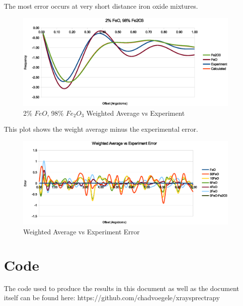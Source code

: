 \documentclass[12pt,letterpaper]{article}
\begin{document}
The most error occurs at very short distance iron oxide mixtures.
\begin{figure}[ht]
  \begin{center}
    \includegraphics[scale=0.8]{figs/2pct_FeO_WeightedAverage.eps}
    \caption{2\% $FeO$, 98\% $Fe_2O_3$ Weighted Average vs Experiment}
  \end{center}
\end{figure}
\clearpage

This plot shows the weight average minus the experimental error.
\begin{figure}[ht]
  \begin{center}
    \includegraphics[scale=0.8]{figs/WeightedAverageVsExperimentError.eps}
    \caption{Weighted Average vs Experiment Error}
  \end{center}
\end{figure}
\clearpage

\section{Code}
The code used to produce the results in this document as well as the document
itself can be found here: https://github.com/chadvoegele/xraysprectrapy
\end{document}
